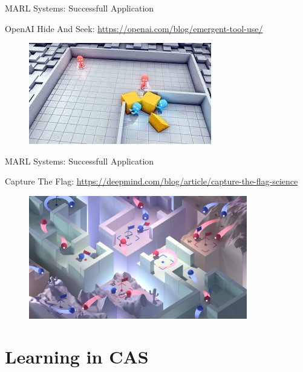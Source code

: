 \documentclass[presentation]{beamer}\mode<presentation>{\usetheme{AMSBolognaFC}}
\begin{document}
\begin{frame}{MARL Systems: Successfull Application}
	\centering
	\begin{exampleblock}{OpenAI Hide And Seek: \url{https://openai.com/blog/emergent-tool-use/}}
		\begin{figure}
			\href{https://www.youtube.com/watch?v=kopoLzvh5jY}{\includegraphics{img/hide-and-seek.jpeg}}
		\end{figure}
	\end{exampleblock}
\end{frame}

\begin{frame}{MARL Systems: Successfull Application}
	
	\begin{exampleblock}{Capture The Flag: \url{https://deepmind.com/blog/article/capture-the-flag-science}}
	\begin{figure}
		\centering
		\href{https://www.youtube.com/watch?v=dltN4MxV1RI}{\includegraphics[width=0.85\textwidth]{img/capture-the-flag.png}}
	\end{figure}	
	\end{exampleblock}
\end{frame}
\section{Learning in CAS}
\end{document}
